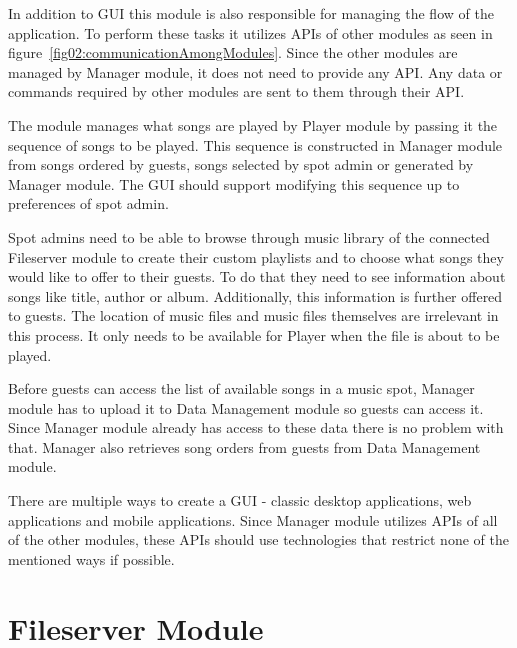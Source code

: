 \par
In addition to GUI this module is also responsible for managing the flow of the application. To perform these tasks it utilizes APIs of other modules as seen in figure~\ref{fig02:communicationAmongModules}. Since the other modules are managed by Manager module, it does not need to provide any API. Any data or commands required by other modules are sent to them through their API.
\par
The module manages what songs are played by Player module by passing it the sequence of songs to be played. This sequence is constructed in Manager module from songs ordered by guests, songs selected by spot admin or generated by Manager module. The GUI should support modifying this sequence up to preferences of spot admin.
\par
Spot admins need to be able to browse through music library of the connected Fileserver module to create their custom playlists and to choose what songs they would like to offer to their guests. To do that they need to see information about songs like title, author or album. Additionally, this information is further offered to guests. The location of music files and music files themselves are irrelevant in this process. It only needs to be available for Player when the file is about to be played.
\par
Before guests can access the list of available songs in a music spot, Manager module has to upload it to Data Management module so guests can access it. Since Manager module already has access to these data there is no problem with that. Manager also retrieves song orders from guests from Data Management module.
\par
There are multiple ways to create a GUI - classic desktop applications, web applications and mobile applications. Since Manager module utilizes APIs of all of the other modules, these APIs should use technologies that restrict none of the mentioned ways if possible.

\section{Fileserver Module}

